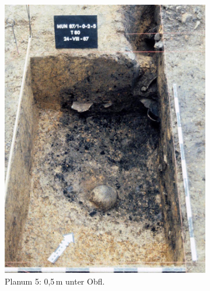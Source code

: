 \begin{figure}[p]
\begin{subfigure}[t]{0.32\textwidth}
		\includegraphics[width = \textwidth]{fig/MUN87-102_Pl5_E87-041-33.jpg}
		\caption{Planum 5: 0,5\,m unter Obfl.}
		\label{fig:MUN87-1-0-2_Pl_5}
	\end{subfigure}\hfill
	\begin{subfigure}[t]{0.32\textwidth}
		\centering

\end{subfigure}
\end{figure}
